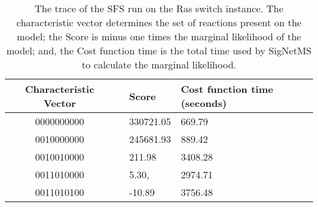 \begin{table}[H]
\centering
\begin{tabular}{c|cll}
\hline
Characteristic Vector && \multicolumn{1}{l}{Score} &
\multicolumn{1}{l}{Cost function time (seconds)} \\
\hline
    0000000000 && 330721.05	& 669.79	\\
    0010000000 && 245681.93	& 889.42	\\
    0010010000 && 211.98	& 3408.28	\\
    0011010000 && 5.30,	& 2974.71	\\
    0011010100 && -10.89	& 3756.48	\\  
\hline
\hline
\end{tabular}
\caption{The trace of the SFS run on the Ras switch instance. The
    characteristic vector determines the set of reactions present on the
    model; the Score is minus one times the marginal likelihood of
    the model; and, the Cost function time is the total time used by 
    SigNetMS to calculate the marginal likelihood.}
\label{tab:sfs_trace}
\end{table}



